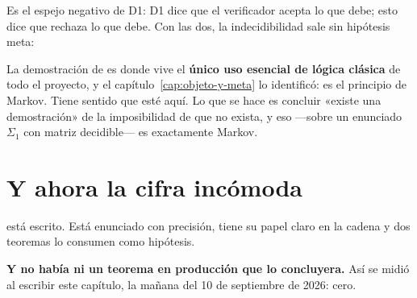 

Es el espejo negativo de D1: D1 dice que el verificador acepta lo que debe; esto dice que rechaza
lo que debe. Con las dos, la indecidibilidad sale sin hipótesis meta:


\begin{observacion}
La demostración de  es donde vive el \textbf{único uso esencial de lógica
clásica} de todo el proyecto, y el capítulo~\ref{cap:objeto-y-meta} lo identificó: es el principio
de Markov. Tiene sentido que esté aquí. Lo que se hace es concluir «existe una demostración» de la
imposibilidad de que no exista, y eso —sobre un enunciado $\Sigma_1$ con matriz decidible— es
exactamente Markov.
\end{observacion}

\section{Y ahora la cifra incómoda}

 está escrito. Está enunciado con precisión, tiene su papel claro en la cadena y
dos teoremas lo consumen como hipótesis.

\textbf{Y no había ni un teorema en producción que lo concluyera.} Así se midió al escribir este
capítulo, la mañana del 10 de septiembre de 2026: cero.

